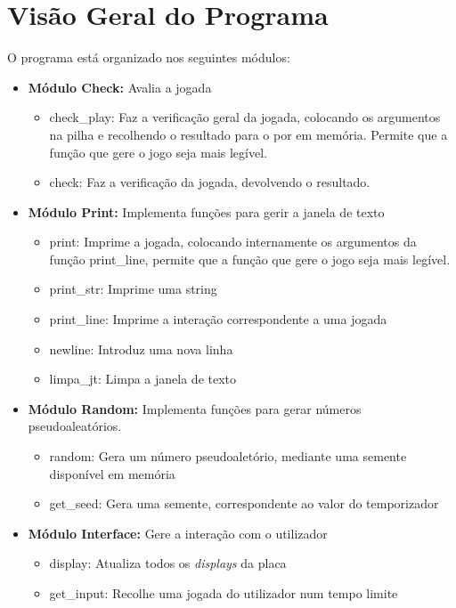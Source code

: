 \documentclass[11pt]{report}
\begin{document}
\section*{Visão Geral do Programa}
O programa está organizado nos seguintes módulos:
\begin{itemize}
\item \textbf{Módulo Check:} Avalia a jogada
  \begin{itemize}
  \item check\_play: Faz a verificação geral da jogada, colocando os
  argumentos na pilha e recolhendo o resultado para o por em memória.
  Permite que a função que gere o jogo seja mais legível.
  \item check: Faz a verificação da jogada, devolvendo o resultado.
  \end{itemize}

\item \textbf{Módulo Print:} Implementa funções para gerir a janela de
texto
  \begin{itemize}
  \item print: Imprime a jogada, colocando internamente os argumentos da
  função print\_line, permite que a função que gere o jogo seja mais
  legível.
  \item print\_str: Imprime uma string
  \item print\_line: Imprime a interação correspondente a uma jogada
  \item newline: Introduz uma nova linha
  \item limpa\_jt: Limpa a janela de texto
  \end{itemize}

\newpage
\item \textbf{Módulo Random:} Implementa funções para gerar números
pseudoaleatórios.
  \begin{itemize}
  \item random: Gera um número pseudoaletório, mediante uma semente
  disponível em memória
  \item get\_seed: Gera uma semente, correspondente ao valor do
  temporizador
  \end{itemize}
 
\item \textbf{Módulo Interface:} Gere a interação com o utilizador
  \begin{itemize}
  \item display: Atualiza todos os \textit{displays} da placa
  \item get\_input: Recolhe uma jogada do utilizador num tempo limite
  \end{itemize}
 

\end{itemize}
\end{document}
